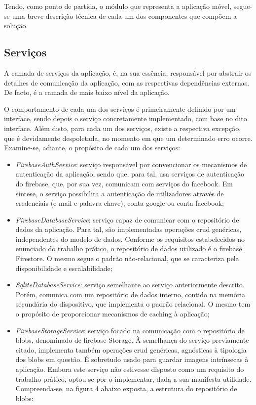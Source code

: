 \documentclass[12pt]{report}
\begin{document}
Tendo, como ponto de partida, o módulo que representa a aplicação móvel, segue-se uma breve descrição técnica de cada um dos componentes que compõem a solução.

\subsection{Serviços}

A camada de serviços da aplicação, é, na sua essência, responsável por abstrair os detalhes de comunicação da aplicação, com as respectivas dependências externas. De facto, é a camada de mais baixo nível da aplicação. 

O comportamento de cada um dos serviços é primeiramente definido por um interface, sendo depois o serviço concretamente implementado, com base no dito interface. Além disto, para cada um dos serviços, existe a respectiva excepção, que é devidamente despoletada, no momento em que um determinado erro ocorre. Examine-se, adiante, o propósito de cada um dos serviços:

\begin{itemize}
    \item \emph{FirebaseAuthService}: serviço responsável por convencionar os mecanismos de autenticação da aplicação, sendo que, para tal, usa serviços de autenticação do \gls{firebase}, que, por sua vez, comunicam com serviços do \gls{facebook}. Em síntese, o serviço possibilita a autenticação de utilizadores através de credenciais (e-mail e palavra-chave), conta \gls{google} ou conta \gls{facebook};
    
    \item \emph{FirebaseDatabaseService}: serviço capaz de comunicar com o repositório de dados da aplicação. Para tal, são implementadas operações \gls{crud} genéricas, independentes do modelo de dados. Conforme os requisitos estabelecidos no enunciado do trabalho prático, o repositório de dados utilizado é o \gls{firebase} Firestore. O mesmo segue o padrão não-relacional, que se caracteriza pela disponibilidade e escalabilidade;
    
    \item \emph{SqliteDatabaseService}: serviço semelhante ao serviço anteriormente descrito. Porém, comunica com um repositório de dados interno, contido na memória secundária do dispositivo, que implementa o padrão relacional. O mesmo tem o propósito de proporcionar mecanismos de \gls{caching} à aplicação;
    
    \item \emph{FirebaseStorageService}: serviço focado na comunicação com o repositório de \gls{blobs}, denominado de \gls{firebase} Storage. À semelhança do serviço previamente citado, implementa também operações \gls{crud} genéricas, agnósticas à tipologia dos \gls{blobs} em questão. É sobretudo usado para guardar imagens intrínsecas à aplicação. Embora este serviço não estivesse disposto como um requisito do trabalho prático, optou-se por o implementar, dada a sua manifesta utilidade. Compreenda-se, na figura 4 abaixo exposta, a estrutura do repositório de \gls{blobs}:
    
\end{itemize}
\end{document}

